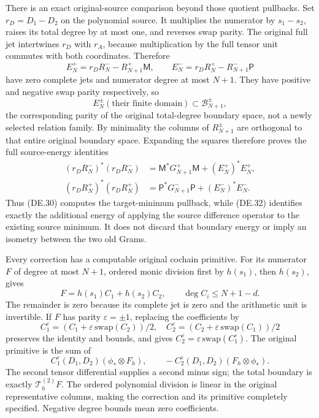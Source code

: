 There is an exact original-source comparison beyond those quotient pullbacks. Set \(r_D=D_1-D_2\) on the polynomial source. It multiplies the numerator by \(s_1-s_2\), raises its total degree by at most one, and reverses swap parity. The original full jet intertwines \(r_D\) with \(r_A\), because multiplication by the full tensor unit commutes with both coordinates. Therefore
\[
 E_N^+=r_DR_N^- -R_{N+1}^+\mathsf M,\qquad
 E_N^-=r_DR_N^+ -R_{N+1}^-\mathsf P
 \tag{DE.31}
\]
have zero complete jets and numerator degree at most \(N+1\). They have positive and negative swap parity respectively, so
\[
 E_N^\pm(\text{their finite domain})\subset
 \mathcal B_{N+1}^\pm,
\]
the corresponding parity of the original total-degree boundary space, not a newly selected relation family. By minimality the columns of \(R_{N+1}^\pm\) are orthogonal to that entire original boundary space. Expanding the squares therefore proves the full source-energy identities
\[
 \boxed{\begin{aligned}
 (r_DR_N^-)^*(r_DR_N^-)
 &=\mathsf M^*G_{N+1}^+\mathsf M+(E_N^+)^*E_N^+,\\
 (r_DR_N^+)^*(r_DR_N^+)
 &=\mathsf P^*G_{N+1}^-\mathsf P+(E_N^-)^*E_N^-.
 \end{aligned}}
 \tag{DE.32}
\]
Thus (DE.30) computes the target-minimum pullback, while (DE.32) identifies exactly the additional energy of applying the source difference operator to the existing source minimum. It does not discard that boundary energy or imply an isometry between the two old Grams.

Every correction has a computable original cochain primitive. For its numerator \(F\) of degree at most \(N+1\), ordered monic division first by \(h(s_1)\), then \(h(s_2)\), gives
\[
 F=h(s_1)C_1+h(s_2)C_2,\qquad \deg C_i\le N+1-d.
\]
The remainder is zero because its complete jet is zero and the arithmetic unit is invertible. If \(F\) has parity \(\varepsilon=\pm1\), replacing the coefficients by
\[
 C_1^\varepsilon=(C_1+\varepsilon\,\mathrm{swap}(C_2))/2,\quad
 C_2^\varepsilon=(C_2+\varepsilon\,\mathrm{swap}(C_1))/2
\]
preserves the identity and bounds, and gives \(C_2^\varepsilon=\varepsilon\,\mathrm{swap}(C_1^\varepsilon)\). The original primitive is the sum of
\[
 C_1^\varepsilon(D_1,D_2)(\phi_*\otimes F_h),\qquad
 -C_2^\varepsilon(D_1,D_2)(F_h\otimes\phi_*).
 \tag{DE.33}
\]
The second tensor differential supplies a second minus sign; the total boundary is exactly \(\mathcal T_h^{(2)}F\). The ordered polynomial division is linear in the original representative columns, making the correction and its primitive completely specified. Negative degree bounds mean zero coefficients.

